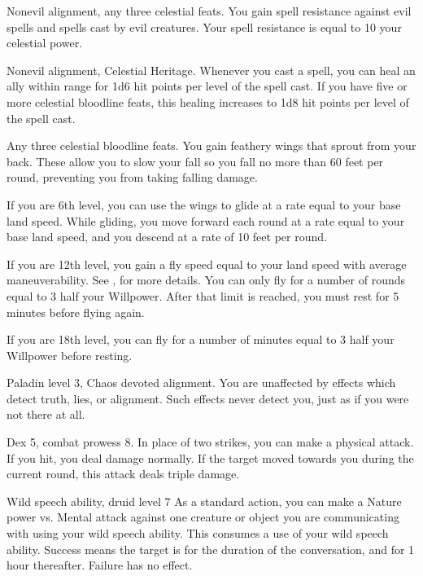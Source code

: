 \featpres Nonevil alignment, any three celestial feats.
\featben You gain spell resistance against evil spells and spells cast by evil creatures.
Your spell resistance is equal to 10 \add your celestial power.

\featpres Nonevil alignment, Celestial Heritage.
\featben Whenever you cast a spell, you can heal an ally within \rngclose range for 1d6 hit points per level of the spell cast.
If you have five or more celestial bloodline feats, this healing increases to 1d8 hit points per level of the spell cast.

\featpre Any three celestial bloodline feats.
\featben You gain feathery wings that sprout from your back.
These allow you to slow your fall so you fall no more than 60 feet per round, preventing you from taking falling damage.

If you are 6th level, you can use the wings to glide at a rate equal to your base land speed.
While gliding, you move forward each round at a rate equal to your base land speed, and you descend at a rate of 10 feet per round.

If you are 12th level, you gain a fly speed equal to your land speed with average maneuverability.
See , for more details.
You can only fly for a number of rounds equal to 3 \add half your Willpower.
After that limit is reached, you must rest for 5 minutes before flying again.

If you are 18th level, you can fly for a number of minutes equal to 3 \add half your Willpower before resting.

\featpre Paladin level 3, Chaos devoted alignment.
\featben You are unaffected by effects which detect truth, lies, or alignment.
Such effects never detect you, just as if you were not there at all.

\featpre Dex 5, combat prowess 8.
\featben In place of two strikes, you can make a physical attack.
If you hit, you deal damage normally.
If the target moved towards you during the current round, this attack deals triple damage.

\featpre Wild speech ability, druid level 7
\featben  As a standard action, you can make a Nature power vs. Mental attack against one creature or object you are communicating with using your wild speech ability.
This consumes a use of your wild speech ability.
Success means the target is \charmed for the duration of the conversation, and for 1 hour thereafter.
Failure has no effect.

